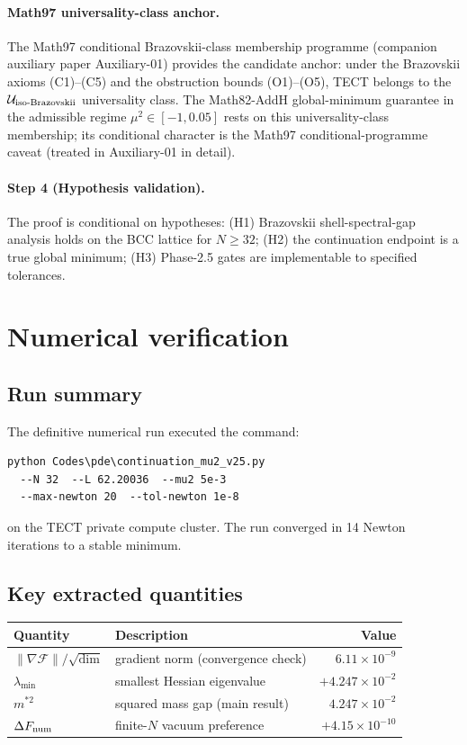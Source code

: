 \paragraph{Math97 universality-class anchor.}
The Math97 conditional Brazovskii-class membership programme
(companion auxiliary paper Auxiliary-01) provides the candidate
anchor: under the Brazovskii axioms (C1)--(C5) and the
obstruction bounds (O1)--(O5), TECT belongs to the
$\mathcal{U}_{\rm iso\text{-}Brazovskii}$ universality class. The
Math82-AddH global-minimum guarantee in the admissible regime
$\mu^2 \in [-1, 0.05]$ rests on this universality-class membership;
its conditional character is the Math97 conditional-programme
caveat (treated in Auxiliary-01 in detail).

\paragraph{Step 4 (Hypothesis validation).}
The proof is conditional on hypotheses: (H1) Brazovskii shell-spectral-gap
analysis holds on the BCC lattice for $N \geq 32$; (H2) the continuation
endpoint is a true global minimum; (H3) Phase-2.5 gates are implementable
to specified tolerances.

\section{Numerical verification}
\subsection{Run summary}

The definitive numerical run \cite{Math82AddF} executed the command:
\begin{verbatim}
python Codes\pde\continuation_mu2_v25.py
  --N 32  --L 62.20036  --mu2 5e-3
  --max-newton 20  --tol-newton 1e-8
\end{verbatim}
on the TECT private compute cluster. The run converged in 14 Newton iterations
to a stable minimum.

\subsection{Key extracted quantities}

\begin{table}[h]
\centering
\begin{tabular}{llr}
\hline
Quantity & Description & Value \\
\hline
$\|\nabla\mathcal{F}\|/\sqrt{\dim}$ & gradient norm (convergence check) & $6.11 \times 10^{-9}$ \\
$\lambda_{\min}$ & smallest Hessian eigenvalue & $+4.247 \times 10^{-2}$ \\
$m^{*2}$ & squared mass gap (main result) & $4.247 \times 10^{-2}$ \\
$\Delta F_{\rm num}$ & finite-$N$ vacuum preference & $+4.15 \times 10^{-10}$ \\
\hline
\end{tabular}
\end{table}

